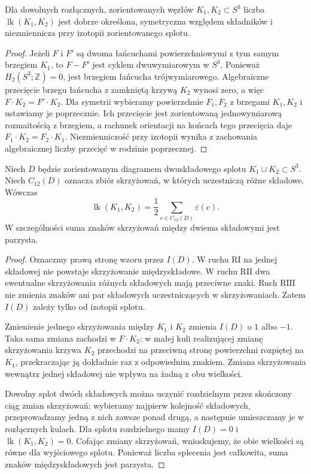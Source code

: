 \begin{stwierdzenie}
Dla dowolnych rozłącznych, zorientowanych węzłów
$K_1,K_2\subset S^3$ liczba $\operatorname{lk}(K_1,K_2)$ jest
dobrze określona, symetryczna względem składników i niezmiennicza
przy izotopii zorientowanego splotu.
\end{stwierdzenie}

\begin{proof}
Jeżeli $F$ i $F'$ są dwoma łańcuchami powierzchniowymi z tym samym
brzegiem $K_1$, to $F-F'$ jest cyklem dwuwymiarowym w $S^3$.
Ponieważ $H_2(S^3;\mathbb Z)=0$, jest brzegiem łańcucha
trójwymiarowego. Algebraiczne przecięcie brzegu łańcucha z zamkniętą
krzywą $K_2$ wynosi zero, a więc $F\cdot K_2=F'\cdot K_2$.
Dla symetrii wybieramy powierzchnie $F_1,F_2$ z brzegami
$K_1,K_2$ i ustawiamy je poprzecznie. Ich przecięcie jest
zorientowaną jednowymiarową rozmaitością z brzegiem, a rachunek
orientacji na końcach tego przecięcia daje
$F_1\cdot K_2=F_2\cdot K_1$. Niezmienniczość przy izotopii wynika z
zachowania algebraicznej liczby przecięć w rodzinie poprzecznej.
\end{proof}

\begin{twierdzenie}
Niech $D$ będzie zorientowanym diagramem dwuskładowego splotu
$K_1\cup K_2\subset S^3$. Niech $C_{12}(D)$ oznacza zbiór
skrzyżowań, w których uczestniczą różne składowe. Wówczas
\[
\operatorname{lk}(K_1,K_2)=\frac12\sum_{c\in C_{12}(D)}\varepsilon(c).
\]
W szczególności suma znaków skrzyżowań między dwiema składowymi
jest parzysta.
\end{twierdzenie}

\begin{proof}
Oznaczmy prawą stronę wzoru przez $I(D)$. W ruchu $\mathrm{R I}$
na jednej składowej nie powstaje skrzyżowanie międzyskładowe.
W ruchu $\mathrm{R II}$ dwa ewentualne skrzyżowania różnych
składowych mają przeciwne znaki. Ruch $\mathrm{R III}$ nie
zmienia znaków ani par składowych uczestniczących w
skrzyżowaniach. Zatem $I(D)$ zależy tylko od izotopii splotu.

Zmienienie jednego skrzyżowania między $K_1$ i $K_2$
zmienia $I(D)$ o $1$ albo $-1$. Taka sama zmiana zachodzi
w $F\cdot K_2$: w małej kuli realizującej zmianę
skrzyżowania krzywa $K_2$ przechodzi na przeciwną stronę
powierzchni rozpiętej na $K_1$, przekraczając ją dokładnie
raz z odpowiednim znakiem. Zmiana skrzyżowania wewnątrz
jednej składowej nie wpływa na żadną z obu wielkości.

Dowolny splot dwóch składowych można uczynić rozdzielnym
przez skończony ciąg zmian skrzyżowań: wybieramy najpierw
kolejność składowych, przeprowadzamy jedną z nich zawsze
ponad drugą, a następnie umieszczamy je w rozłącznych kulach.
Dla splotu rozdzielnego mamy $I(D)=0$ i
$\operatorname{lk}(K_1,K_2)=0$. Cofając zmiany skrzyżowań,
wnioskujemy, że obie wielkości są równe dla wyjściowego
splotu. Ponieważ liczba splecenia jest całkowita, suma znaków
międzyskładowych jest parzysta.
\end{proof}

